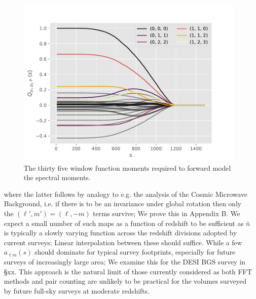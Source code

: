 \documentclass[useAMS,usenatbib]{mn2e}
\begin{document}
\begin{figure}
    \centering
    \includegraphics[scale=0.55]{Qs.pdf}
    \caption{The thirty five window function moments required to forward model the spectral moments.}
    \label{fig:qs}
\end{figure}
where the latter follows by analogy to e.g. the analysis of the Cosmic 
Microwave Background, i.e. if there is to be an invariance under global rotation then only the $(\ell', m') = (\ell, -m)$ terms survive;  We prove this in Appendix B.  We expect a small number of such maps as a function of redshift to be sufficient as $\bar n$ is typically a slowly varying function across the redshift divisions adopted by current surveys;  Linear interpolation between these should suffice.  While a few $a_{\ell m }(s)$ should dominate for typical survey footprints, especially for future surveys of increasingly large area;  We examine this for the DESI BGS survey in \S xx.  This approach is the natural limit of those currently considered as both FFT methods and pair counting are unlikely to be practical for the volumes surveyed by future full-sky surveys at moderate redshifts.
\end{document}
